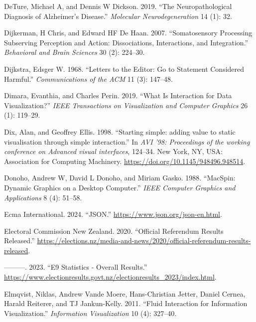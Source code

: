 \documentclass[
]{book}
\newlength{\cslhangindent}
\newenvironment{CSLReferences}[2] %
 {\begin{list}{}{%
  \setlength{\itemindent}{0pt}
  \setlength{\leftmargin}{0pt}
  \setlength{\parsep}{0pt}
  \ifodd #1
   \setlength{\leftmargin}{\cslhangindent}
   \setlength{\itemindent}{-1\cslhangindent}
  \fi
  \setlength{\itemsep}{#2\baselineskip}}}
 {\end{list}}
\theoremstyle{definition}
\theoremstyle{definition}
\theoremstyle{definition}
\theoremstyle{definition}
\theoremstyle{remark}
\begin{document}
\begin{CSLReferences}{1}{0}
DeTure, Michael A, and Dennis W Dickson. 2019. {``The Neuropathological Diagnosis of Alzheimer's Disease.''} \emph{Molecular Neurodegeneration} 14 (1): 32.

Dijkerman, H Chris, and Edward HF De Haan. 2007. {``Somatosensory Processing Subserving Perception and Action: Dissociations, Interactions, and Integration.''} \emph{Behavioral and Brain Sciences} 30 (2): 224--30.

Dijkstra, Edsger W. 1968. {``Letters to the Editor: Go to Statement Considered Harmful.''} \emph{Communications of the ACM} 11 (3): 147--48.

Dimara, Evanthia, and Charles Perin. 2019. {``What Is Interaction for Data Visualization?''} \emph{IEEE Transactions on Visualization and Computer Graphics} 26 (1): 119--29.

Dix, Alan, and Geoffrey Ellis. 1998. {``{Starting simple: adding value to static visualisation through simple interaction}.''} In \emph{{AVI '98: Proceedings of the working conference on Advanced visual interfaces}}, 124--34. New York, NY, USA: Association for Computing Machinery. \url{https://doi.org/10.1145/948496.948514}.

Donoho, Andrew W, David L Donoho, and Miriam Gasko. 1988. {``MacSpin: Dynamic Graphics on a Desktop Computer.''} \emph{IEEE Computer Graphics and Applications} 8 (4): 51--58.

Ecma International. 2024. {``JSON.''} \url{https://www.json.org/json-en.html}.

Electoral Commission New Zealand. 2020. {``Official Referendum Results Released.''} \url{https://elections.nz/media-and-news/2020/official-referendum-results-released}.

---------. 2023. {``E9 Statistics - Overall Results.''} \url{https://www.electionresults.govt.nz/electionresults_2023/index.html}.

Elmqvist, Niklas, Andrew Vande Moere, Hans-Christian Jetter, Daniel Cernea, Harald Reiterer, and TJ Jankun-Kelly. 2011. {``Fluid Interaction for Information Visualization.''} \emph{Information Visualization} 10 (4): 327--40.


\end{CSLReferences}
\end{document}
